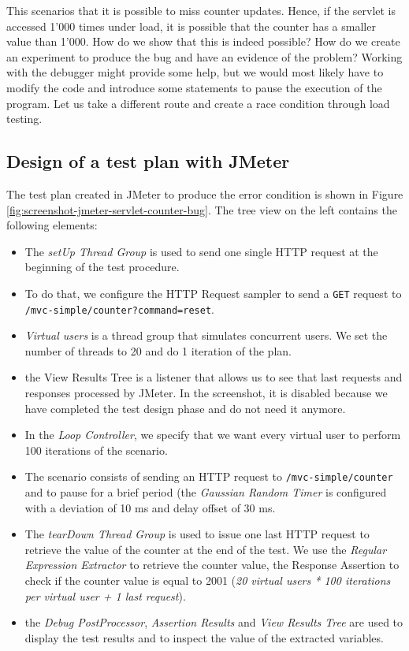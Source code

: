 This scenarios that it is possible to miss counter updates. Hence, if the servlet is accessed 1'000 times under load, it is possible that the counter has a smaller value than 1'000. How do we show that this is indeed possible? How do we create an experiment to produce the bug and have an evidence of the problem? Working with the debugger might provide some help, but we would most likely have to modify the code and introduce some statements to pause the execution of the program. Let us take a different route and create a race condition through load testing.

\subsection{Design of a test plan with JMeter}


The test plan created in JMeter to produce the error condition is shown in Figure \ref{fig:screenshot-jmeter-servlet-counter-bug}. The tree view on the left contains the following elements:

\begin{itemize}
\item The \emph{setUp Thread Group} is used to send one single HTTP request at the beginning of the test procedure.
\item To do that, we configure the HTTP Request sampler to send a \texttt{GET} request to \texttt{/mvc-simple/counter?command=reset}.
\item \emph{Virtual users} is a thread group that simulates concurrent users. We set the number of threads to 20 and do 1 iteration of the plan.
\item the View Results Tree is a listener that allows us to see that last requests and responses processed by JMeter. In the screenshot, it is disabled because we have completed the test design phase and do not need it anymore.
\item In the \emph{Loop Controller}, we specify that we want every virtual user to perform 100 iterations of the scenario.
\item The scenario consists of sending an HTTP request to \texttt{/mvc-simple/counter} and to pause for a brief period (the \emph{Gaussian Random Timer} is configured with a deviation of 10 ms and delay offset of 30 ms.
\item The \emph{tearDown Thread Group} is used to issue one last HTTP request to retrieve the value of the counter at the end of the test. We use the \emph{Regular Expression Extractor} to retrieve the counter value, the Response Assertion to check if the counter value is equal to 2001 (\emph{20 virtual users * 100 iterations per virtual user + 1 last request}).
\item the \emph{Debug PostProcessor}, \emph{Assertion Results} and \emph{View Results Tree} are used to display the test results and to inspect the value of the extracted variables.
\end{itemize}

